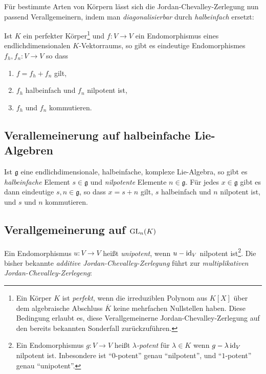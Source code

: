 Für bestimmte Arten von Körpern lässt sich die Jordan-Chevalley-Zerlegung nun passend Verallgemeinern, indem man \emph{diagonalisierbar} durch \emph{halbeinfach} ersetzt:

\begin{theorem}
  Ist $K$ ein perfekter Körper\footnote{
  Ein Körper $K$ ist \emph{perfekt}, wenn die irreduziblen Polynom aus $K[X]$ über dem algebraische Abschluss $\overline{K}$ keine mehrfachen Nullstellen haben. 
  Diese Bedingung erlaubt es, diese Verallgemeinerne Jordan-Chevalley-Zerlegung auf den bereits bekannten Sonderfall zurückzuführen.}
  und $f \colon V \to V$ ein Endomorphismus eines endlichdimensionalen $K$-Vektorraums, so gibt es eindeutige Endomorphismes $f_h, f_n \colon V \to V$ so dass
  \begin{enumerate}
    \item
      $f = f_h + f_n$ gilt,
    \item
      $f_h$ halbeinfach und $f_n$ nilpotent ist,
    \item
      $f_h$ und $f_n$ kommutieren.
  \end{enumerate}
\end{theorem}



\subsection*{Verallemeinerung auf halbeinfache Lie-Algebren}

Ist $\mathfrak{g}$ eine endlichdimensionale, halbeinfache, komplexe Lie-Algebra, so gibt es \emph{halbeinfache} Element $s \in \mathfrak{g}$ und \emph{nilpotente} Elemente $n \in \mathfrak{g}$.
Für jedes $x \in \mathfrak{g}$ gibt es dann eindeutige $s, n \in \mathfrak{g}$, so dass $x = s + n$ gilt, $s$ halbeinfach und $n$ nilpotent ist, und $s$ und $n$ kommutieren.



\subsection*{Verallgemeinerung auf $\operatorname{GL}_{n}(K)$}

Ein Endomorphismus $u \colon V \to V$ heißt \emph{unipotent}, wenn $u - \operatorname{id}_V$ nilpotent ist\footnote{
Ein Endomorphismus $g \colon V \to V$ heißt \emph{$\lambda$-potent} für $\lambda \in K$ wenn $g - \lambda \operatorname{id}_V$ nilpotent ist.
Inbesondere ist \enquote{$0$-potent} genau \enquote{nilpotent}, und \enquote{$1$-potent} genau \enquote{unipotent}.}.
Die bisher bekannte \emph{additive Jordan-Chevalley-Zerlegung} führt zur \emph{multiplikativen Jordan-Chevalley-Zerlegeng}:

